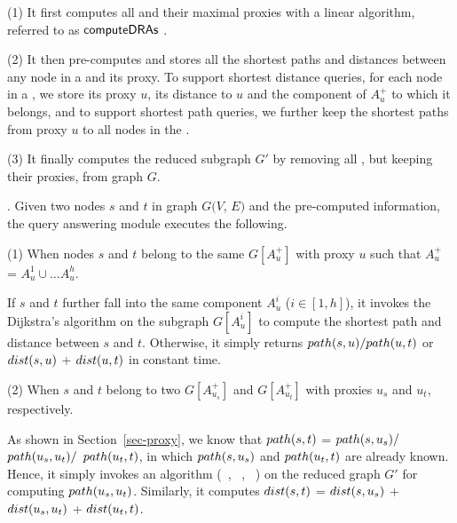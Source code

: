 \sstab (1) It first computes all \dras and their maximal proxies with a linear algorithm, referred to as  ${\mathsf{computeDRAs}}$ \cite{journal-version2016}.

\sstab (2) It then pre-computes and stores all the shortest paths and distances between any node in a \dra and its proxy.
%
To support shortest distance queries, for each node in a \dra, we store its proxy $u$, its distance to $u$ and the component of $A^{+}_u$ to which it belongs,
and to support shortest path queries, we further keep the shortest paths from proxy $u$ to all nodes in the \dra.

\sstab (3) It finally computes the reduced subgraph $G'$ by removing all \dras, but keeping their proxies, from graph $G$.


. Given two nodes $s$ and $t$ in graph $G(V$, $E)$  and the pre-computed information, the query answering module executes the following.


\sstab (1) When nodes $s$ and $t$ belong to the same \dra $G[A^+_u]$ with proxy $u$ such that $A^+_u$ = $A^1_u\cup\ldots A^h_u$.

If $s$ and $t$ further fall into the same component $A^i_u$ ($i\in[1,h]$), it invokes the Dijkstra's algorithm on the subgraph $G[A^i_u]$ to compute the shortest path and distance between $s$ and $t$. Otherwise, it simply returns $\path(s, u)/\path(u, t)$ or $\dist(s, u)$ + $\dist(u, t)$ in constant time.

\sstab (2)  When $s$ and $t$ belong to two \dras $G[A^+_{u_s}]$ and $G[A^+_{u_t}]$ with proxies $u_s$ and $u_t$, respectively.

 As shown in Section~\ref{sec-proxy}, we know that $\path(s, t)$ = $\path(s, u_s)/$ $\path(u_s, u_t)/$ $\path(u_t, t)$, in which $\path(s, u_s)$ and $\path(u_t, t)$ are already known. Hence, it simply invokes an algorithm (\eg~\arcflag \cite{MohringSSWW05}, \tnr~\cite{bast2014route}, \ah~\cite{zhu2013shortest}) on the reduced graph $G'$ for computing $\path(u_s, u_t)$.
%
Similarly, it computes $\dist(s, t)$ = $\dist(s, u_s)$ + $\dist(u_s, u_t)$ + $\dist(u_t, t)$.



